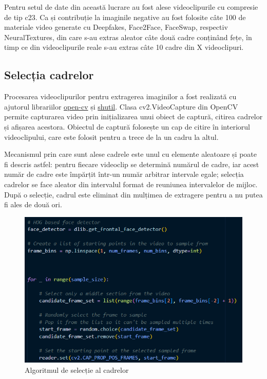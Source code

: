 Pentru setul de date din această lucrare au fost alese videoclipurile cu compresie de tip c23. Ca și contribuție la imaginile negative au fost folosite câte 100 de materiale video generate cu Deepfakes, Face2Face, FaceSwap, respectiv NeuralTextures, din care s-au extras aleator câte două cadre conținând fețe, în timp ce din videoclipurile reale s-au extras câte 10 cadre din X videoclipuri. 

\subsection{Selecția cadrelor}

Procesarea videoclipurilor pentru extragerea imaginilor a fost realizată cu ajutorul librariilor \href{https://opencv.org/}{open-cv} și \href{https://docs.python.org/3/library/shutil.html}{shutil}. Clasa cv2.VideoCapture din OpenCV permite capturarea video prin inițializarea unui obiect de captură, citirea cadrelor și afișarea acestora. Obiectul de captură folosește un cap de citire în interiorul videoclipului, care este folosit pentru a trece de la un cadru la altul. 

Mecanismul prin care sunt alese cadrele este unul cu elemente aleatoare și poate fi descris astfel: pentru fiecare videoclip se determină numărul de cadre, iar acest număr de cadre este împărțit într-un număr arbitrar intervale egale; selecția cadrelor se face aleator din intervalul format de reuniunea intervalelor de mijloc. După o selecție, cadrul este eliminat din mulțimea de extragere pentru a nu putea fi ales de două ori. 

\begin{figure}[h]
         \centering 
         \includegraphics[width=0.65\linewidth]{images/frame_selection_ss.png}
         \captionsetup{font=footnotesize}
         \caption{Algoritmul de selecție al cadrelor}
\end{figure}

\newpage

